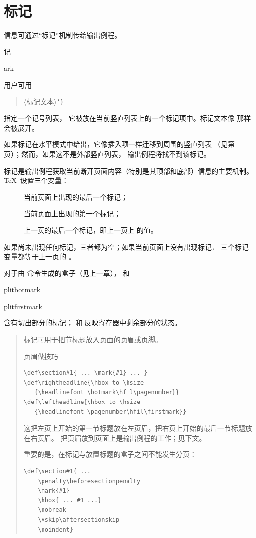 \documentclass[a4paper]{rapport3}
\makeatletter
\def\lb{{\tt\char`\{}}\def\rb{{\tt\char`\}}}
\def\gr#1{$\langle$#1$\rangle$}\def\key#1{{\tt#1}}
\newenvironment{disp}{\begin{quotation}}{\end{quotation}}
\newenvironment{example}{\begin{quotation}}{\end{quotation}}
\def\term#1\par{\index{#1}}
\def\howto#1\par{}
\def\cstoidx#1\par{\index{#1@\cs{#1}}}
\def\csidx#1{\cstoidx #1\par\cs{#1}}
\makeatother
\begin{document}
\section{标记}

信息可通过“标记”机制传给输出例程。
\term 标记\par\cstoidx mark\par
用户可用 \begin{disp}\cs{mark}\lb\gr{标记文本}\rb\end{disp} 指定一个记号列表，
它被放在当前竖直列表上的一个标记项中。标记文本像  那样会被展开。

如果标记在水平模式中给出，它像插入项一样迁移到周围的竖直列表
（见第~\pageref{migrate} 页）；然而，如果这不是外部竖直列表，
输出例程将找不到该标记。

标记是输出例程获取当前断开页面内容（特别是其顶部和底部）信息的主要机制。
\TeX\ 设置三个变量：
\begin{description} 
\item [\csidx{botmark}]
   当前页面上出现的最后一个标记；
\item [\csidx{firstmark}]
   当前页面上出现的第一个标记；
\item [\csidx{topmark}]
   上一页的最后一个标记，即上一页上  的值。
\end{description}
如果尚未出现任何标记，三者都为空；如果当前页面上没有出现标记，
三个标记变量都等于上一页的 。

对于由  命令生成的盒子（见上一章），
 和 
\cstoidx splitbotmark\par\cstoidx splitfirstmark\par
含有切出部分的标记； 和  反映寄存器中剩余部分的状态。

\begin{example} 标记可用于把节标题放入页面的页眉或页脚。
\howto 对页眉做技巧\par
\begin{verbatim}
\def\section#1{ ... \mark{#1} ... }
\def\rightheadline{\hbox to \hsize
   {\headlinefont \botmark\hfil\pagenumber}}
\def\leftheadline{\hbox to \hsize
   {\headlinefont \pagenumber\hfil\firstmark}}
\end{verbatim}
这把左页上开始的第一节标题放在左页眉，把右页上开始的最后一节标题放在右页眉。
把页眉放到页面上是输出例程的工作；见下文。

重要的是，在标记与放置标题的盒子之间不能发生分页：
\begin{verbatim}
\def\section#1{ ...
    \penalty\beforesectionpenalty
    \mark{#1}
    \hbox{ ... #1 ...}
    \nobreak
    \vskip\aftersectionskip
    \noindent}
\end{verbatim}
\end{example}
\end{document}
